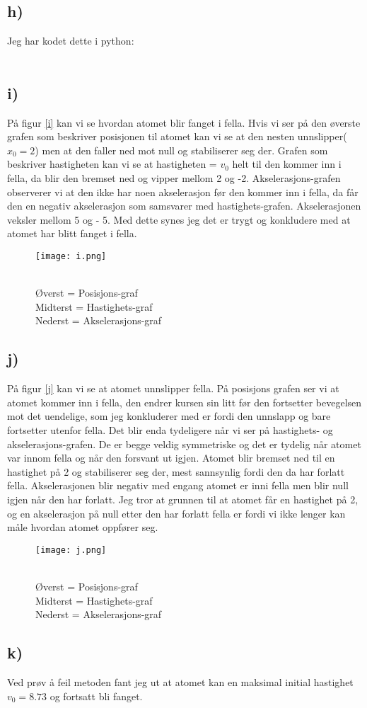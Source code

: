 \documentclass[a4paper,12pt,norsk]{article}
\begin{document}
\subsection*{h)}
Jeg har kodet dette i python:\\
\\


\subsection*{i)}
På figur \vref{i} kan vi se hvordan atomet blir fanget i fella. Hvis vi ser på den øverste grafen som beskriver posisjonen til atomet kan vi se at den nesten unnslipper($x_0 = 2$) men at den faller ned mot null og stabiliserer seg der. Grafen som beskriver hastigheten kan vi se at hastigheten = $v_0$ helt til den kommer inn i fella, da blir den bremset ned og vipper mellom 2 og -2. Akselerasjons-grafen observerer vi at den ikke har noen akselerasjon før den kommer inn i fella, da får den en negativ akselerasjon som samsvarer med hastighets-grafen. Akselerasjonen veksler mellom 5 og - 5. Med dette synes jeg det er trygt og konkludere med at atomet har blitt fanget i fella.
\begin{figure}[h!]
\centering
\captionsetup{justification=centering}
\texttt{[image: i.png]} 
\caption{\\Øverst = Posisjons-graf\\ Midterst = Hastighets-graf \\ Nederst = Akselerasjons-graf}
\label{i}
\end{figure} 

\subsection*{j)}
På figur \vref{j} kan vi se at atomet unnslipper fella. På posisjons grafen ser vi at atomet kommer inn i fella, den endrer kursen sin litt før den fortsetter bevegelsen mot det uendelige, som jeg konkluderer med er fordi den unnslapp og bare fortsetter utenfor fella. Det blir enda tydeligere når vi ser på hastighets- og akselerasjons-grafen. De er begge veldig symmetriske og det er tydelig når atomet var innom fella og når den forsvant ut igjen. Atomet blir bremset ned til en hastighet på 2 og stabiliserer seg der, mest sannsynlig fordi den da har forlatt fella. Akselerasjonen blir negativ med engang atomet er inni fella men blir null igjen når den har forlatt. Jeg tror at grunnen til at atomet får en hastighet på 2, og en akselerasjon på null etter den har forlatt fella er fordi vi ikke lenger kan måle hvordan atomet oppfører seg. 
\begin{figure}[h!]
\centering
\captionsetup{justification=centering}
\texttt{[image: j.png]} 
\caption{\\Øverst = Posisjons-graf\\ Midterst = Hastighets-graf \\ Nederst = Akselerasjons-graf}
\label{j}
\end{figure} 

\subsection*{k)}
Ved prøv å feil metoden fant jeg ut at atomet kan en maksimal initial hastighet $v_0 = 8.73$ og fortsatt bli fanget.
\end{document}
